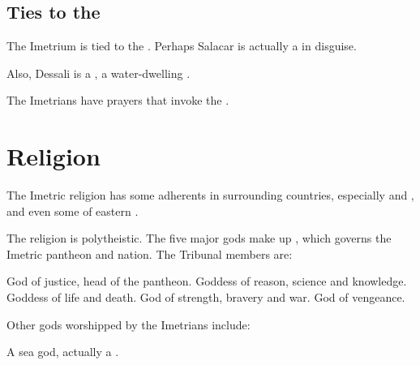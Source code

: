 \subsection{Ties to the \nagae}
The Imetrium is tied to the \nagae. 
Perhaps Salacar is actually a \nagalord{} in disguise. 

Also, Dessali is a \naiad, a water-dwelling . 

The Imetrians have prayers that invoke the \nagae. 









\section{Religion}
The Imetric religion has some adherents in surrounding countries, especially  and , and even some of eastern . 

The religion is polytheistic. 
The five major gods make up , which governs the Imetric pantheon and nation. 
The Tribunal members are: 
  
\begin{gloss}
    God of justice, head of the pantheon.
    Goddess of reason, science and knowledge. 
  \index{\NishiS}
    Goddess of life and death. 
    God of strength, bravery and war. 
  \gitemlink[Hiothrex]{\Hiothrex}
  \index{\Hiothrex}
    God of vengeance. 
\end{gloss}

Other gods worshipped by the Imetrians include: 

\begin{gloss}
  A sea god, actually a \nagalord. 
\end{gloss}





